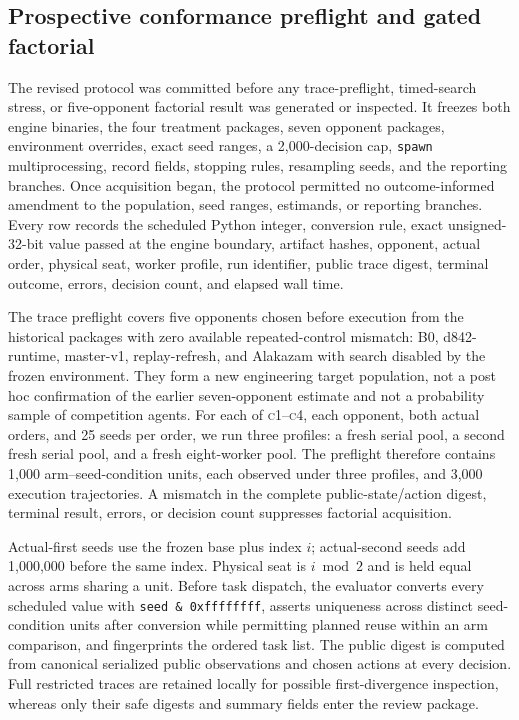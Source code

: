 \documentclass[aps,reprint,superscriptaddress,longbibliography,floatfix]{revtex4-2}
\newcommand{\COne}{\textsc{c1}}
\newcommand{\CFour}{\textsc{c4}}
\begin{document}
\subsection{Prospective conformance preflight and gated factorial}

The revised protocol was committed before any trace-preflight, timed-search
stress, or five-opponent factorial result was generated or inspected.  It
freezes both engine binaries, the four treatment packages, seven opponent
packages, environment overrides, exact seed ranges, a 2,000-decision cap,
\texttt{spawn} multiprocessing, record fields, stopping rules, resampling
seeds, and the reporting branches.  Once acquisition began, the protocol
permitted no outcome-informed amendment to the population, seed ranges,
estimands, or reporting branches.  Every row records the scheduled Python
integer, conversion rule, exact unsigned-32-bit value passed at the engine
boundary, artifact hashes,
opponent, actual order, physical seat, worker profile, run identifier, public
trace digest, terminal outcome, errors, decision count, and elapsed wall time.

The trace preflight covers five opponents chosen before execution from the
historical packages with zero available repeated-control mismatch: B0,
d842-runtime, master-v1, replay-refresh, and Alakazam with search disabled by
the frozen environment.  They form a new engineering target population, not a
post hoc confirmation of the earlier seven-opponent estimate and not a
probability sample of competition agents.  For each of \COne--\CFour, each
opponent, both actual orders, and 25 seeds per order, we run three profiles: a
fresh serial pool, a second fresh serial pool, and a fresh eight-worker pool.
The preflight therefore contains 1,000 arm--seed-condition units, each observed
under three profiles, and 3,000 execution trajectories.  A mismatch in the
complete public-state/action digest, terminal
result, errors, or decision count suppresses factorial acquisition.

Actual-first seeds use the frozen base plus index $i$; actual-second seeds add
1,000,000 before the same index.  Physical seat is $i\bmod2$ and is held equal
across arms sharing a unit.  Before task dispatch, the evaluator converts every
scheduled value with \texttt{seed \& 0xffffffff}, asserts uniqueness across
distinct seed-condition units after conversion while permitting planned reuse
within an arm comparison, and fingerprints the ordered task list.  The
public digest is computed from canonical serialized public observations and
chosen actions at every decision.  Full restricted traces are retained locally
for possible first-divergence inspection, whereas only their safe digests and
summary fields enter the review package.
\end{document}
